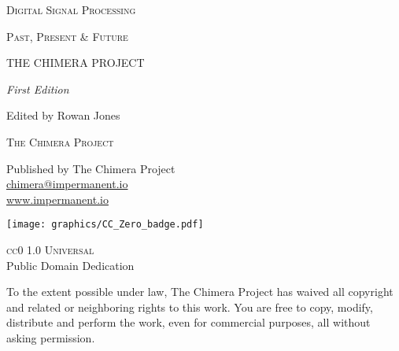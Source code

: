 \newpage
\thispagestyle{empty}
\vspace*{4cm}
\begin{center}

{\fontsize{11}{13}\selectfont\textsc{Digital Signal Processing}}

\vspace{0.3cm}

{\fontsize{11}{13}\selectfont\textsc{Past, Present \& Future}}

\vspace{3cm}

{\trajantitle\fontsize{32}{38}\selectfont THE CHIMERA PROJECT}

\vspace*{\fill}

{\Large\textit{First Edition}}

\vspace{1cm}

{\large Edited by Rowan Jones}

\vspace{2cm}

\end{center}
\newpage

\newpage
\thispagestyle{empty}
\vspace*{\fill}
\begin{center}

{\large\textsc{The Chimera Project}}

\vspace{1.5cm}

Published by The Chimera Project\\
\href{mailto:chimera@impermanent.io}{chimera@impermanent.io}\\
\url{www.impermanent.io}

\vspace{2cm}

\texttt{[image: graphics/CC\_Zero\_badge.pdf]}

\vspace{0.8cm}

{\large\textsc{cc0 1.0 Universal}}\\
\vspace{0.3cm}
{\normalsize Public Domain Dedication}

\vspace{1.5cm}

\begin{minipage}{0.75\textwidth}
\centering
{\small To the extent possible under law, The Chimera Project has waived all copyright and related or neighboring rights to this work. You are free to copy, modify, distribute and perform the work, even for commercial purposes, all without asking permission.}
\end{minipage}

\end{center}
\vspace*{\fill}
\newpage